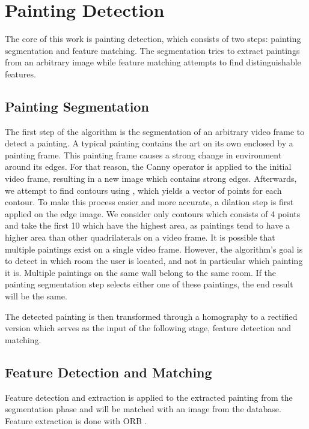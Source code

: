 \section{Painting Detection}
\label{sec:painting_detection}




	The core of this work is painting detection, which consists of two steps: painting segmentation and feature matching. The segmentation tries to extract paintings from an arbitrary image while feature matching attempts to find distinguishable features.

	\subsection{Painting Segmentation}
	The first step of the algorithm is the segmentation of an arbitrary video frame to detect a painting. A typical painting contains the art on its own enclosed by a painting frame. This painting frame causes a strong change in environment around its edges. For that reason, the Canny operator \cite{Canny1986} is applied to the initial video frame, resulting in a new image which contains strong edges. Afterwards, we attempt to find contours using \cite{SUZUKI198532}, which yields a vector of points for each contour. To make this process easier and more accurate, a dilation step is first applied on the edge image. We consider only contours which consists of 4 points and take the first 10 which have the highest area, as paintings tend to have a higher area than other quadrilaterals on a video frame. It is possible that multiple paintings exist on a single video frame. However, the algorithm's goal is to detect in which room the user is located, and not in particular which painting it is. Multiple paintings on the same wall belong to the same room. If the painting segmentation step selects either one of these paintings, the end result will be the same. 
	

	The detected painting is then transformed through a homography to a rectified version which serves as the input of the following stage, feature detection and matching.

	\subsection{Feature Detection and Matching}
	
	
	Feature detection and extraction is applied to the extracted painting from the segmentation phase and will be matched with an image from the database. Feature extraction is done with ORB \cite{Rublee2011}.

